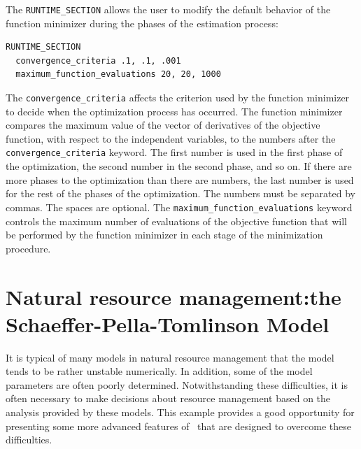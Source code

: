 \documentclass{admbmanual}
\begin{document}
The \texttt{RUNTIME\_SECTION} allows the user to modify the default behavior of
the function minimizer during the phases of the estimation process:
\begin{lstlisting}
RUNTIME_SECTION
  convergence_criteria .1, .1, .001
  maximum_function_evaluations 20, 20, 1000
\end{lstlisting}

The \texttt{convergence\_criteria} affects the criterion used by the function
minimizer to decide when the optimization process has occurred. The function
minimizer compares the maximum value of the vector of derivatives of the
objective function, with respect to the independent variables, to the numbers
after the \texttt{convergence\_criteria} keyword. The first number is used in
the first phase of the optimization, the second number in the second phase, and
so on. If there are more phases to the optimization than there are numbers, the
last number is used for the rest of the phases of the optimization. The numbers
must be separated by commas. The spaces are optional.
The \texttt{maximum\_function\_evaluations} keyword controls the maximum number
of evaluations of the objective function that will be performed by the function
minimizer in each stage of the minimization procedure.

\section{Natural resource management:\br the Schaeffer-Pella-Tomlinson Model}

It is typical of many models in natural resource management that the model tends
to be rather unstable numerically. In addition, some of the model parameters are
often poorly determined. Notwithstanding these difficulties, it is often
necessary to make decisions about resource management based on the analysis
provided by these models. This example provides a good opportunity for
presenting some more advanced features of \ADM\ that are designed to overcome
these difficulties.
\end{document}
